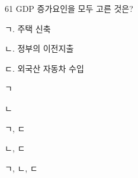 \begin{question}{61}
GDP 증가요인을 모두 고른 것은?
\begin{framedtext}
ㄱ. 주택 신축 \par
ㄴ. 정부의 이전지출 \par
ㄷ. 외국산 자동차 수입 \par
\end{framedtext}
\begin{choices}
  \item ㄱ
  \item ㄴ
  \item ㄱ, ㄷ
  \item ㄴ, ㄷ
  \item ㄱ, ㄴ, ㄷ
\end{choices}
\end{question}
